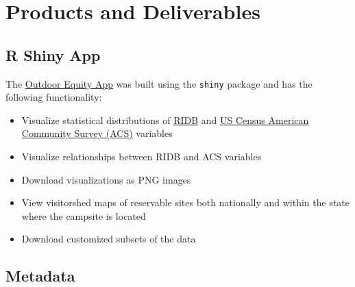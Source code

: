 \documentclass[
]{book}
\providecommand{\tightlist}{%
  \setlength{\itemsep}{0pt}\setlength{\parskip}{0pt}}
\begin{document}
\hypertarget{products-and-deliverables}{%
\chapter{Products and Deliverables}\label{products-and-deliverables}}

\hypertarget{r-shiny-app}{%
\section{R Shiny App}\label{r-shiny-app}}

The \href{https://shinyapps.bren.ucsb.edu/oe_app/}{Outdoor Equity App} was built using the \texttt{shiny} package \citep{R-shiny} and has the following functionality:

\begin{itemize}
\tightlist
\item
  Visualize statistical distributions of \href{https://ridb.recreation.gov/download}{RIDB} and \href{https://www.census.gov/programs-surveys/acs/data.html}{US Census American Community Survey (ACS)} variables
\item
  Visualize relationships between RIDB and ACS variables
\item
  Download visualizations as PNG images
\item
  View visitorshed maps of reservable sites both nationally and within the state where the campsite is located
\item
  Download customized subsets of the data
\end{itemize}

\hypertarget{metadata}{%
\section{Metadata}\label{metadata}}
\end{document}
